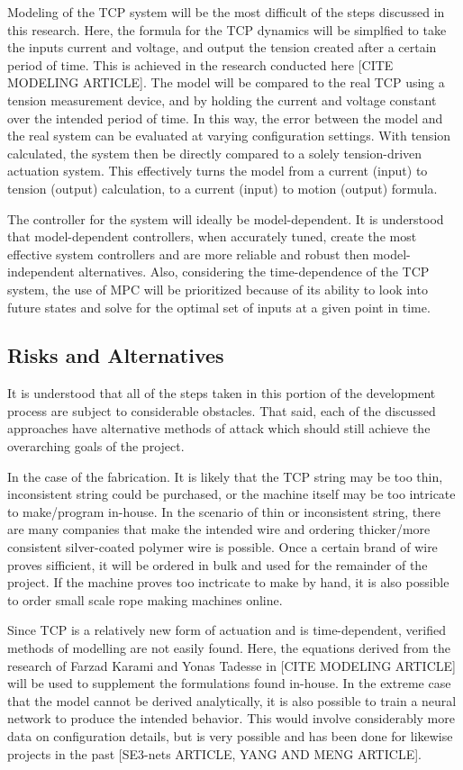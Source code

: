 Modeling of the TCP system will be the most difficult of the steps discussed in this research. Here, the formula for the TCP dynamics will be simplfied to take the inputs current and voltage, and output the tension created after a certain period of time. This is achieved in the research conducted here [CITE MODELING ARTICLE]. The model will be compared to the real TCP using a tension measurement device, and by holding the current and voltage constant over the intended period of time. In this way, the error between the model and the real system can be evaluated at varying configuration settings. With tension calculated, the system then be directly compared to a solely tension-driven actuation system. This effectively turns the model from a current (input) to tension (output) calculation, to a current (input) to motion (output) formula.

The controller for the system will ideally be model-dependent. It is understood that model-dependent controllers, when accurately tuned, create the most effective system controllers and are more reliable and robust then model-independent alternatives. Also, considering the time-dependence of the TCP system, the use of MPC will be prioritized because of its ability to look into future states and solve for the optimal set of inputs at a given point in time.

\subsection{Risks and Alternatives}

It is understood that all of the steps taken in this portion of the development process are subject to considerable obstacles. That said, each of the discussed approaches have alternative methods of attack which should still achieve the overarching goals of the project.

In the case of the fabrication. It is likely that the TCP string may be too thin, inconsistent string could be purchased, or the machine itself may be too intricate to make/program in-house. In the scenario of thin or inconsistent string, there are many companies that make the intended wire and ordering thicker/more consistent silver-coated polymer wire is possible. Once a certain brand of wire proves sifficient, it will be ordered in bulk and used for the remainder of the project. If the machine proves too inctricate to make by hand, it is also possible to order small scale rope making machines online.

Since TCP is a relatively new form of actuation and is time-dependent, verified methods of modelling are not easily found. Here, the equations derived from the research of Farzad Karami and Yonas Tadesse in [CITE MODELING ARTICLE] will be used to supplement the formulations found in-house. In the extreme case that the model cannot be derived analytically, it is also possible to train a neural network to produce the intended behavior. This would involve considerably more data on configuration details, but is very possible and has been done for likewise projects in the past [SE3-nets ARTICLE, YANG AND MENG ARTICLE].

